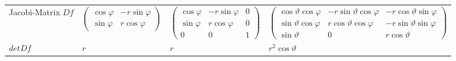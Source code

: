 \begin{tabular}{|p{2.5cm}||p{3cm}|p{4.2cm}|p{7.5cm}|}
\begin{minipage}{7.5cm}
    \end{minipage}\\
	\hline
	Jacobi-Matrix $Df$ &
	\begin{minipage}{3cm}
    \vspace{0.1cm}
		$\begin{pmatrix}
         	\cos\varphi & -r\sin\varphi\\
         	\sin\varphi & r\cos\varphi
         \end{pmatrix}$
    \vspace{0.1cm}
    \end{minipage}&	
	\begin{minipage}{4.2cm}
    \vspace{0.1cm}
		$\begin{pmatrix}
         	\cos\varphi & -r\sin\varphi & 0\\
         	\sin\varphi & r\cos\varphi & 0\\
         	0 & 0 & 1
         \end{pmatrix}$
    \vspace{0.1cm}
    \end{minipage}&	
	\begin{minipage}{7.5cm}
    \vspace{0.1cm}
		$\begin{pmatrix}
         	\cos\vartheta\cos\varphi & -r\sin\vartheta\cos\varphi &
         	-r\cos\vartheta\sin\varphi\\
         	\sin\vartheta\cos\varphi & r\cos\vartheta\cos\varphi &
         	-r\sin\vartheta\sin\varphi\\
         	\sin\vartheta & 0 & r\cos\vartheta
         \end{pmatrix}$
    \vspace{0.1cm}
    \end{minipage}\\
	\hline
	\begin{minipage}{2.5cm}
    	\vspace{0.1cm}
  		$detDf$   
  		\vspace{0.1cm}
    \end{minipage}&
		$r$ &
		$r$ &
		$r^2\cos\vartheta$\\
	\hline	
\end{tabular}